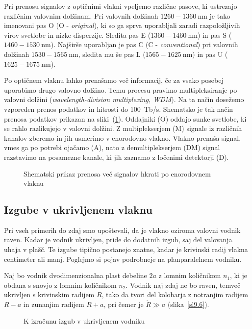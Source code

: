 \begin{remark}
Pri prenosu signalov z optičnimi vlakni vpeljemo različne pasove, ki ustrezajo 
različnim valovnim dolžinam. Pri valovnih dolžinah $1260-1360~\si{\nano\meter}$ je tako imenovani
pas O (O - {\it original}), ki so ga sprva uporabljali zaradi razpoložljivih virov svetlobe
in nizke disperzije. Sledita pas E ($1360-1460~\si{\nano\meter}$) in pas S ($1460-1530~\si{\nano\meter}$). 
Najširše uporabljan je pas C (C - {\it conventional}) pri valovnih dolžinah $1530-1565~\si{\nano\meter}$,
sledita mu še pas L ($1565-1625~\si{\nano\meter}$) in pas U ($1625-1675~\si{\nano\meter}$).

Po optičnem vlaknu lahko prenašamo več informacij, če za vsako posebej uporabimo
drugo valovno dolžino. Temu procesu pravimo multipleksiranje po valovni dolžini
({\it wavelength-division multiplexing, WDM}).
Na ta način dosežemo vzporeden prenos podatkov in hitrosti do 100~Tb/s.
Shematsko je tak način prenosa podatkov prikazan na sliki~(\ref{WDM}).
Oddajniki (O) oddajo sunke svetlobe, ki se rahlo razlikujejo v valovni dolžini. 
Z multiplekserjem (M) signale iz različnih kanalov zberemo in jih usmerimo v 
enorodovno vlakno. Vlakno prenaša signal, vmes ga po potrebi ojačamo (A), 
nato z demultiplekserjem (DM) signal razstavimo na posamezne kanale, ki jih 
zaznamo z ločenimi detektorji (D).
\begin{figure}[h]
\centering
\def\svgwidth{120truemm} 
 
\caption{Shematski prikaz prenosa več signalov hkrati po enorodovnem vlaknu}
\label{WDM}
\end{figure}
\end{remark}

\subsection*{Izgube v ukrivljenem vlaknu}
Pri vseh primerih do zdaj smo upoštevali, da je vlakno oziroma valovni 
vodnik raven. Kadar je vodnik ukrivljen, pride do dodatnih izgub, saj 
del valovanja uhaja v plašč. Te izgube tipično postanejo znatne, 
kadar je krivinski radij vlakna centimeter ali manj. Poglejmo si pojav podrobneje na
planparalelnem vodniku.

Naj bo vodnik dvodimenzionalna plast debeline $2a$ z lomnim količnikom
$n_{1}$, ki je obdana s snovjo z lomnim količnikom $n_{2}$. Vodnik naj
zdaj ne bo raven, temveč ukrivljen s krivinskim radijem $R$, tako da tvori 
del kolobarja z notranjim radijem $R-a$ in zunanjim radijem $R+a$, pri 
čemer je $\dot{R}\gg a$ (slika~\ref{sl9.6}). 
\begin{figure}[h]
\centering
\def\svgwidth{60truemm} 
% 
\caption{K izračunu izgub v ukrivljenem vodniku}
\label{fig:bend}
\end{figure}

